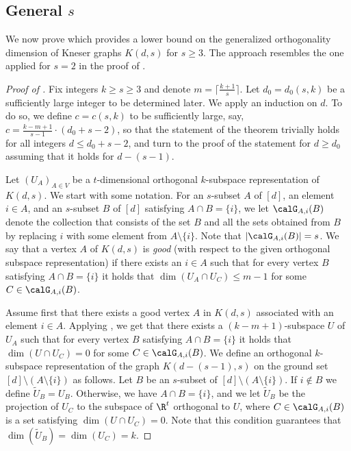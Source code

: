 \subsection{General \texorpdfstring{$s$}{s}}

We now prove 
which provides a lower bound on the generalized orthogonality dimension
%
%
of Kneser graphs $K(d,s)$ for $s \geq 3$.
The approach resembles the one applied for $s=2$ in the proof of .

\begin{proof}[Proof of ]
Fix integers $k \geq s \geq 3$ and denote $m = \lceil \frac{k+1}{s} \rceil$.
Let $d_0=d_0(s,k)$ be a sufficiently large integer to be determined later.
We apply an induction on $d$.
To do so, we define $c=c(s,k)$ to be sufficiently large, say, $c=\frac{k-m+1}{s-1} \cdot (d_0+s-2)$, so that the statement of the theorem trivially holds for all integers $d \leq d_0+s-2$, and turn to
%
the proof of %
the statement for $d \geq d_0$ assuming that it holds for $d-(s-1)$.

Let $(U_A)_{A \in V}$ be a $t$-dimensional orthogonal $k$-subspace representation of $K(d,s)$.
We start with some notation.
For an $s$-subset $A$ of $[d]$, an element $i \in A$, and an $s$-subset $B$ of $[d]$ satisfying $A \cap B = \{i\}$, we let $\calG_{A,i}(B)$ denote the collection that consists of the set $B$ and all the sets obtained from $B$ by replacing $i$ with some element from $A \setminus \{i\}$. Note that $|\calG_{A,i}(B)|=s$.
We say that a vertex $A$ of $K(d,s)$ is \emph{good} (with respect to the given orthogonal subspace representation) if there exists an $i \in A$ such that for every vertex $B$ satisfying $A \cap B = \{i\}$ it holds that $\dim(U_A \cap U_C) \leq m-1$ for some $C \in \calG_{A,i}(B)$.

Assume first that there exists a good vertex $A$ in $K(d,s)$ associated with an element $i \in A$.
Applying , we get that there exists a $(k-m+1)$-subspace $U$ of $U_A$ such that for every vertex $B$ satisfying $A \cap B = \{i\}$ it holds that $\dim(U \cap U_C) =0$ for some $C \in \calG_{A,i}(B)$.
We define an orthogonal $k$-subspace representation of the graph $K(d-(s-1),s)$ on the ground set $[d] \setminus (A \setminus \{i\})$ as follows. Let $B$ be an $s$-subset of $[d] \setminus (A \setminus \{i\})$.
If $i \notin B$ we define $\widetilde{U}_B = U_B$. Otherwise, we have $A \cap B = \{i\}$, and we let $\widetilde{U}_B$ be the projection of $U_C$ to the subspace of $\R^t$ orthogonal to $U$, where $C \in \calG_{A,i}(B)$ is a set satisfying $\dim(U \cap U_C) =0$. Note that this condition guarantees that $\dim(\widetilde{U}_B) = \dim(U_C) = k$.


\end{proof}
